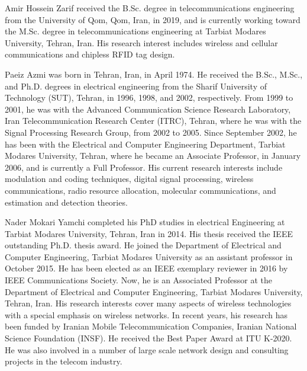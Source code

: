\documentclass[journal]{IEEEtran}
\begin{document}
\begin{IEEEbiography} {Amir Hossein Zarif}
received the B.Sc. degree in telecommunications engineering from the University of Qom, Qom, Iran, in 2019, and is currently working toward the M.Sc. degree in telecommunications engineering at Tarbiat Modares University, Tehran, Iran. His research interest includes wireless and cellular communications and chipless RFID tag design.
\end{IEEEbiography}
\begin{IEEEbiography} {Paeiz Azmi}
was born in Tehran, Iran, in April 1974. He received the B.Sc., M.Sc., and Ph.D. degrees in electrical engineering from the Sharif University of Technology (SUT), Tehran, in 1996, 1998, and 2002, respectively. From 1999 to 2001, he was with the Advanced Communication Science Research Laboratory, Iran Telecommunication Research Center (ITRC), Tehran, where he was with the Signal Processing Research Group, from 2002 to 2005. Since September 2002, he has been with the Electrical and Computer Engineering Department, Tarbiat Modares University, Tehran, where he became an Associate Professor, in January 2006, and is currently a Full Professor. His current research interests include modulation and coding techniques, digital signal processing, wireless communications, radio resource allocation, molecular communications, and estimation and detection theories.
\end{IEEEbiography}
\begin{IEEEbiography} {Nader Mokari Yamchi}
completed his PhD studies in electrical Engineering at Tarbiat Modares University, Tehran, Iran in 2014. His thesis received the IEEE outstanding Ph.D. thesis award. He joined the Department of Electrical and Computer Engineering, Tarbiat Modares University as an assistant professor in October 2015. He has been elected as an IEEE exemplary reviewer in 2016 by IEEE Communications Society. Now, he is an Associated Professor at the Department of Electrical and Computer Engineering, Tarbiat Modares University, Tehran, Iran. His research interests cover many aspects of wireless technologies with a special emphasis on wireless networks. In recent years, his research has been funded by Iranian Mobile Telecommunication Companies, Iranian National Science Foundation (INSF). He received the Best Paper Award at ITU K-2020. He was also involved in a number of large scale network design and consulting projects in the telecom industry.
\end{IEEEbiography}
\end{document}
